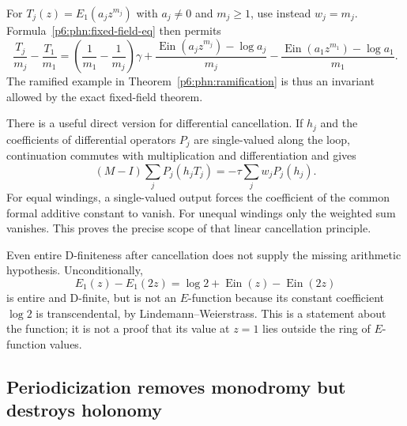\documentclass[11pt,a4paper]{article}
\theoremstyle{definition}
\theoremstyle{remark}
\numberwithin{equation}{section}
\begin{document}
For $T_j(z)=E_1(a_jz^{m_j})$ with $a_j\ne0$ and $m_j\geq1$, use instead
$w_j=m_j$.  Formula~\eqref{p6:phn:fixed-field-eq} then permits
\[
 \frac{T_j}{m_j}-\frac{T_1}{m_1}
 =\left(\frac1{m_1}-\frac1{m_j}\right)\gamma
 +\frac{\operatorname{Ein}(a_jz^{m_j})-\log a_j}{m_j}
 -\frac{\operatorname{Ein}(a_1z^{m_1})-\log a_1}{m_1}.
\]
The ramified example in Theorem~\ref{p6:phn:ramification} is thus an
invariant allowed by the exact fixed-field theorem.

There is a useful direct version for differential cancellation.
If $h_j$ and the coefficients of differential operators $P_j$ are
single-valued along the loop, continuation commutes with
multiplication and differentiation and gives
\begin{equation}\label{p6:phn:differential-cancellation}
 (M-I)\sum_jP_j(h_jT_j)=-\tau\sum_j w_jP_j(h_j).
\end{equation}
For equal windings, a single-valued output forces the coefficient
of the common formal additive constant to vanish.  For unequal
windings only the weighted sum vanishes.  This proves the precise
scope of that linear cancellation principle.

Even entire D-finiteness after cancellation does not supply the
missing arithmetic hypothesis.  Unconditionally,
\[
 E_1(z)-E_1(2z)=\log2+\operatorname{Ein}(z)
                            -\operatorname{Ein}(2z)
\]
is entire and D-finite, but is not an $E$-function because its
constant coefficient $\log2$ is transcendental, by
Lindemann--Weierstrass.  This is a statement about the function;
it is not a proof that its value at $z=1$ lies outside the ring of
$E$-function values.

\subsection{Periodicization removes monodromy but destroys holonomy}
\end{document}
